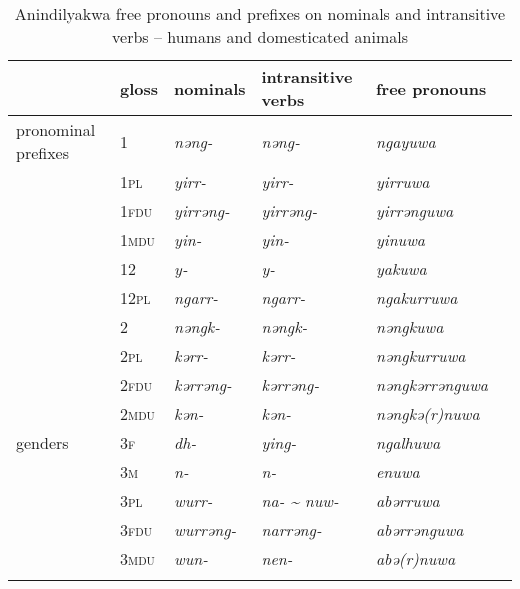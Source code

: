 \documentclass[output=paper]{langscibook}
\begin{document}

\begin{table}
\begin{tabularx}{\textwidth}{Xp{0.7cm}XXXX}
\lsptoprule
& gloss & nominals & intransitive verbs & free pronouns \\
\hline
pronominal prefixes & \textsc{1} & \textit{nəng-} & \textit{nəng-} & \textit{ngayuwa}\\
  & \textsc{1pl} & \textit{yirr-} & \textit{yirr-} & \textit{yirruwa}\\
 & \textsc{1fdu} & \textit{yirrəng-} & \textit{yirrəng-} & \textit{yirrənguwa}\\
  & \textsc{1mdu} & \textit{yin-} & \textit{yin-} & \textit{yinuwa}\\
  & \textsc{12} & \textit{y-} & \textit{y-} & \textit{yakuwa}\\
  & \textsc{12pl} & \textit{ngarr-} & \textit{ngarr-} & \textit{ngakurruwa}\\
  & \textsc{2} & \textit{nəngk-} & \textit{nəngk-} & \textit{nəngkuwa}\\
  & \textsc{2pl} & \textit{kərr-} & \textit{kərr-} & \textit{nəngkurruwa}\\
  & \textsc{2fdu} & \textit{kərrəng-} & \textit{kərrəng-} & \textit{nəngkərrənguwa}\\
  & \textsc{2mdu} & \textit{kən-} & \textit{kən-} & \textit{nəngkə(r)nuwa}\\
genders  & \textsc{3f} & \textit{dh-} & \textit{ying-} & \textit{ngalhuwa}\\
  & \textsc{3m} & \textit{n-} & \textit{n-} & \textit{enuwa}\\
  & \textsc{3pl} & \textit{wurr-} & \textit{na- {\textasciitilde} nuw-} & \textit{abərruwa}\\
  & \textsc{3fdu} & \textit{wurrəng-} & \textit{narrəng-} & \textit{abərrənguwa}\\
  & \textsc{3mdu} & \textit{wun-} & \textit{nen-} & \textit{abə(r)nuwa}\\
 \lspbottomrule
\end{tabularx}
\caption{Anindilyakwa free pronouns and prefixes on nominals and intransitive verbs -- humans and domesticated animals}
\label{tab:vanegmond:1}
\end{table}
\end{document}
